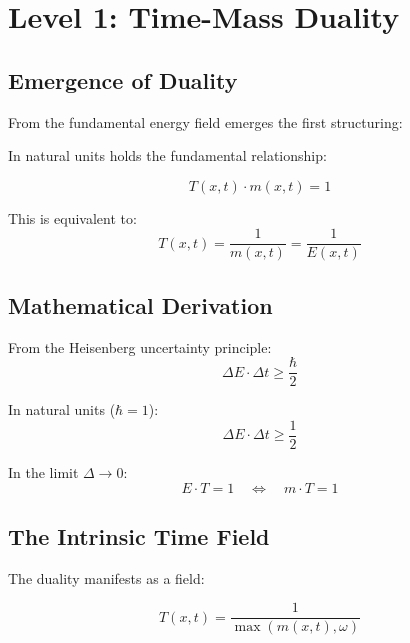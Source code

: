 	\section{Level 1: Time-Mass Duality}
	
	\subsection{Emergence of Duality}
	
	From the fundamental energy field emerges the first structuring:
	
	\begin{keyresult}
		In natural units holds the fundamental relationship:
		
		\begin{equation}
			\boxed{T(x,t) \cdot m(x,t) = 1}
		\end{equation}
		
		This is equivalent to:
		\begin{equation}
			T(x,t) = \frac{1}{m(x,t)} = \frac{1}{E(x,t)}
		\end{equation}
	\end{keyresult}
	
	\subsection{Mathematical Derivation}
	
	From the Heisenberg uncertainty principle:
	\begin{equation}
		\Delta E \cdot \Delta t \geq \frac{\hbar}{2}
	\end{equation}
	
	In natural units ($\hbar = 1$):
	\begin{equation}
		\Delta E \cdot \Delta t \geq \frac{1}{2}
	\end{equation}
	
	In the limit $\Delta \to 0$:
	\begin{equation}
		E \cdot T = 1 \quad \Leftrightarrow \quad m \cdot T = 1
	\end{equation}
	
	\subsection{The Intrinsic Time Field}
	
	The duality manifests as a field:
	
	\begin{equation}
		\boxed{T(x,t) = \frac{1}{\max(m(x,t), \omega)}}
	\end{equation}
	
